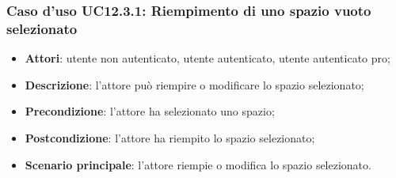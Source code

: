 \subsubsection{Caso d'uso UC12.3.1: Riempimento di uno spazio vuoto selezionato}
\begin{itemize}
\item \textbf{Attori}: utente non autenticato, utente autenticato, utente autenticato pro;
\item \textbf{Descrizione}: l'attore può riempire o modificare lo spazio selezionato;
\item \textbf{Precondizione}: l'attore ha selezionato uno spazio;
\item \textbf{Postcondizione}: l'attore ha riempito lo spazio selezionato;
\item \textbf{Scenario principale}: l'attore riempie o modifica lo spazio selezionato. 
\end{itemize}

